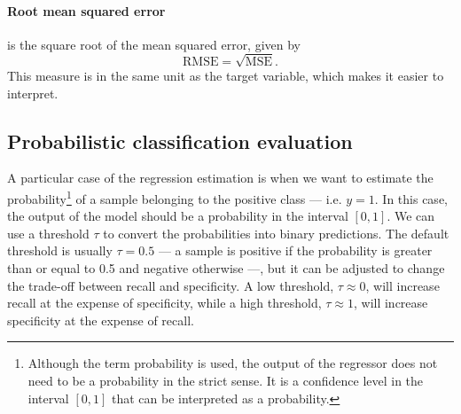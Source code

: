 \paragraph{Root mean squared error} is the square root of the mean squared error, given by
\begin{equation*}
  \text{RMSE} = \sqrt{\text{MSE}}\text{.}
\end{equation*}
This measure is in the same unit as the target variable, which makes it easier to
interpret.



\subsection{Probabilistic classification evaluation}

A particular case of the regression estimation is when we want to estimate the
probability\footnote{Although the term probability is used, the output of the regressor
does not need to be a probability in the strict sense.  It is a confidence level in the
interval $[0, 1]$ that can be interpreted as a probability.} of a sample belonging to the
positive class --- i.e. $y = 1$.  In this case, the output of the model should be a
probability in the interval $[0, 1]$.  We can use a threshold $\tau$ to convert the
probabilities into binary predictions.  The default threshold is usually $\tau = 0.5$ ---
a sample is positive if the probability is greater than or equal to 0.5 and negative
otherwise ---, but it can be adjusted to change the trade-off between recall and
specificity. A low threshold, $\tau \approx 0$, will increase recall at the expense of
specificity, while a high threshold, $\tau \approx 1$, will increase specificity at the
expense of recall.

